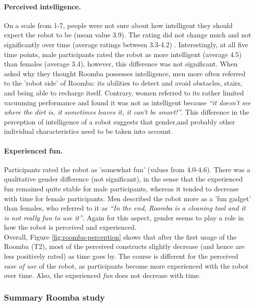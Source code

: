 \documentclass{frontiersSCNS} %
\begin{document}
\paragraph*{Perceived intelligence.} On a scale from 1-7, people were not sure
about how intelligent they should expect the robot to be (mean value 3.9). The
rating did not change much and not significantly over time (average ratings
between 3.3-4.2) \citep{fink_living_2013}. Interestingly, at all five time
points, male participants rated the robot as more intelligent (average 4.5) than
females (average 3.4), however, this difference was not significant. When asked
why they thought Roomba possesses intelligence, men more often referred to the
'robot side' of Roomba: its abilities to detect and avoid obstacles, stairs, and
being able to recharge itself. Contrary, women referred to its rather limited
vacuuming performance and found it was not as intelligent because \textit{``it
doesn't see where the dirt is, it sometimes leaves it, it can't be smart!''}.
This difference in the perception of intelligence of a robot suggests that
gender,and probably other individual characteristics need to be taken into
account.

\paragraph*{Experienced fun.} Participants rated the robot as 'somewhat fun'
(values from 4.0-4.6). There was a qualitative gender difference (not
significant), in the sense that the experienced fun remained quite stable for
male participants, whereas it tended to decrease with time for female
participants. Men described the robot more as a 'fun gadget' than females, who
referred to it as \textit{``In the end, Roomba is a cleaning tool and it is not
really fun to use it''}. Again for this aspect, gender seems to play a role in
how the robot is perceived and experienced.\\

Overall, Figure \ref{fig:roomba-perception} shows that after the first usage of
the Roomba (T2), most of the perceived constructs slightly decrease (and hence
are less positively rated) as time goes by. The course is different for the
perceived \textit{ease of use} of the robot, as participants become more
experienced with the robot over time. Also, the experienced \textit{fun} does
not decrease with time.
 

\subsubsection{Summary Roomba study\\}
\end{document}
